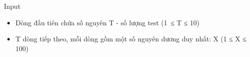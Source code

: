 Input
\begin{itemize}
	\item     Dòng đầu tiên chứa số nguyên T - số lượng test (1 ≤ T ≤ 10)   
	\item     T dòng tiếp theo, mỗi dòng gồm một số nguyên dương duy nhất: X (1 ≤ X ≤ 100)   
\end{itemize}